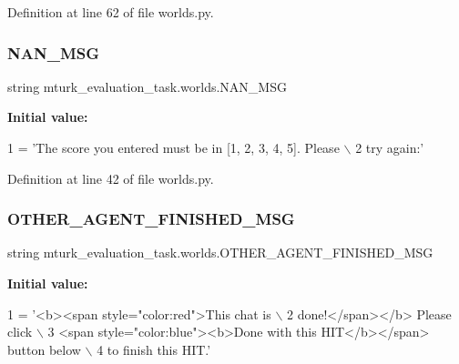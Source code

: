 Definition at line 62 of file worlds.\+py.

\mbox{\label{namespacemturk__evaluation__task_1_1worlds_aba56b9ed87396e8825170ace11113d92}} 
\subsubsection{\texorpdfstring{N\+A\+N\+\_\+\+M\+SG}{NAN\_MSG}}
{\footnotesize\ttfamily string mturk\+\_\+evaluation\+\_\+task.\+worlds.\+N\+A\+N\+\_\+\+M\+SG}

{\bfseries Initial value\+:}
\begin{DoxyCode}
1 =  \textcolor{stringliteral}{'The score you entered must be in [1, 2, 3, 4, 5]. Please \(\backslash\)}
2 \textcolor{stringliteral}{        try again:'}
\end{DoxyCode}


Definition at line 42 of file worlds.\+py.

\mbox{\label{namespacemturk__evaluation__task_1_1worlds_a5ed691ea7cb63087533221ab6598a20c}} 
\subsubsection{\texorpdfstring{O\+T\+H\+E\+R\+\_\+\+A\+G\+E\+N\+T\+\_\+\+F\+I\+N\+I\+S\+H\+E\+D\+\_\+\+M\+SG}{OTHER\_AGENT\_FINISHED\_MSG}}
{\footnotesize\ttfamily string mturk\+\_\+evaluation\+\_\+task.\+worlds.\+O\+T\+H\+E\+R\+\_\+\+A\+G\+E\+N\+T\+\_\+\+F\+I\+N\+I\+S\+H\+E\+D\+\_\+\+M\+SG}

{\bfseries Initial value\+:}
\begin{DoxyCode}
1 =  \textcolor{stringliteral}{'<b><span style="color:red">This chat is \(\backslash\)}
2 \textcolor{stringliteral}{    done!</span></b> Please click \(\backslash\)}
3 \textcolor{stringliteral}{    <span style="color:blue"><b>Done with this HIT</b></span> button below \(\backslash\)}
4 \textcolor{stringliteral}{    to finish this HIT.'}
\end{DoxyCode}


